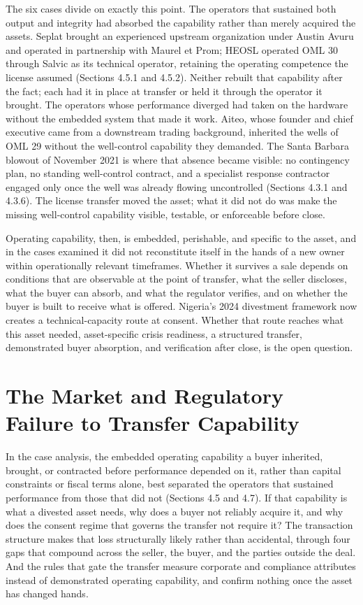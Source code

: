 The six cases divide on exactly this point. The operators that sustained
both output and integrity had absorbed the capability rather than merely
acquired the assets. Seplat brought an experienced upstream organization
under Austin Avuru and operated in partnership with Maurel et Prom;
HEOSL operated OML 30 through Salvic as its technical operator,
retaining the operating competence the license assumed (Sections 4.5.1
and 4.5.2). Neither rebuilt that capability after the fact; each had it
in place at transfer or held it through the operator it brought. The
operators whose performance diverged had taken on the hardware without
the embedded system that made it work. Aiteo, whose founder and chief
executive came from a downstream trading background, inherited the wells
of OML 29 without the well-control capability they demanded. The Santa
Barbara blowout of November 2021 is where that absence became visible:
no contingency plan, no standing well-control contract, and a specialist
response contractor engaged only once the well was already flowing
uncontrolled (Sections 4.3.1 and 4.3.6). The license transfer moved the
asset; what it did not do was make the missing well-control capability
visible, testable, or enforceable before close.

Operating capability, then, is embedded, perishable, and specific to the
asset, and in the cases examined it did not reconstitute itself in the
hands of a new owner within operationally relevant timeframes. Whether
it survives a sale depends on conditions that are observable at the
point of transfer, what the seller discloses, what the buyer can absorb,
and what the regulator verifies, and on whether the buyer is built to
receive what is offered. Nigeria's 2024 divestment framework now creates
a technical-capacity route at consent. Whether that route reaches what
this asset needed, asset-specific crisis readiness, a structured
transfer, demonstrated buyer absorption, and verification after close,
is the open question.

\hypertarget{the-market-and-regulatory-failure-to-transfer-capability}{%
\section{The Market and Regulatory Failure to Transfer
Capability}\label{the-market-and-regulatory-failure-to-transfer-capability}}

In the case analysis, the embedded operating capability a buyer
inherited, brought, or contracted before performance depended on it,
rather than capital constraints or fiscal terms alone, best separated
the operators that sustained performance from those that did not
(Sections 4.5 and 4.7). If that capability is what a divested asset
needs, why does a buyer not reliably acquire it, and why does the
consent regime that governs the transfer not require it? The transaction
structure makes that loss structurally likely rather than accidental,
through four gaps that compound across the seller, the buyer, and the
parties outside the deal. And the rules that gate the transfer measure
corporate and compliance attributes instead of demonstrated operating
capability, and confirm nothing once the asset has changed hands.

